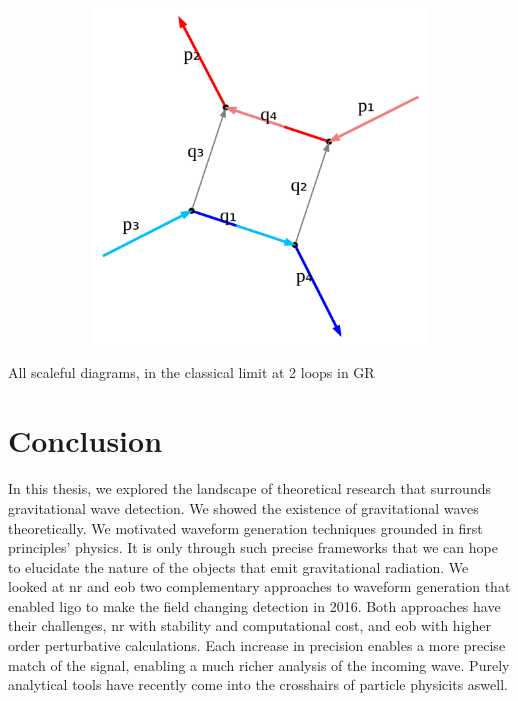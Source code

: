 \documentclass[
  11pt,
  a4paper,
  DIV=11,
  numbers=noendperiod,
  twoside]{scrreprt}
\DeclareRobustCommand{\[}{\begin{equation}}
\DeclareRobustCommand{\]}{\end{equation}}
\begin{document}
\hypertarget{fig-2lGRclassical}{}
{
\makeatletter
\def\LT@makecaption#1#2#3{%
  \noalign{\smash{\hbox{\kern\textwidth\rlap{\kern\marginparsep
  \parbox[t]{\marginparwidth}{%
    \footnotesize{%
      \vspace{(1.1\baselineskip)}
    #1{#2: }\ignorespaces #3}}}}}}%
    }
\makeatother

\begin{figure}[H]

{\centering \includegraphics[width=8in,height=3.5in]{./scattering_files/figure-latex/dot-figure-2.png}

}

\end{figure}

\label{fig-2lGRclassical}All scaleful diagrams, in the classical limit
at 2 loops in GR

}


\hypertarget{sec-conclusion}{%
\chapter{Conclusion}\label{sec-conclusion}}

In this thesis, we explored the landscape of theoretical research that
surrounds gravitational wave detection. We showed the existence of
gravitational waves theoretically. We motivated waveform generation
techniques grounded in first principles' physics. It is only through
such precise frameworks that we can hope to elucidate the nature of the
objects that emit gravitational radiation. We looked at \gls{nr} and
\gls{eob} two complementary approaches to waveform generation that
enabled \gls{ligo} to make the field changing detection in 2016. Both
approaches have their challenges, \gls{nr} with stability and
computational cost, and \gls{eob} with higher order perturbative
calculations. Each increase in precision enables a more precise match of
the signal, enabling a much richer analysis of the incoming wave. Purely
analytical tools have recently come into the crosshairs of particle
physicits aswell.
\end{document}
